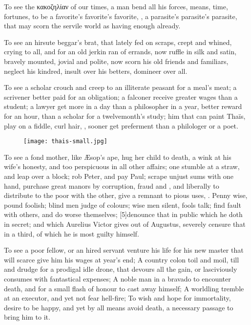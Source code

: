 {To see the \textgreek{κακοζηλίαν} of our times, a man bend all his forces, means,
time, fortunes, to be a favorite's favorite's favorite, \etc{}, a
parasite's parasite's parasite, that may scorn the servile world as
having enough already.

To see an hirsute beggar's brat, that lately fed on scraps, crept and
whined, crying to all, and for an old jerkin ran of errands, now ruffle
in silk and satin, bravely mounted, jovial and polite, now scorn his
old friends and familiars, neglect his kindred, insult over his
betters, domineer over all.

To see a scholar crouch and creep to an illiterate peasant for a meal's
meat; a scrivener better paid for an obligation; a falconer receive
greater wages than a student; a lawyer get more in a day than a
philosopher in a year, better reward for an hour, than a scholar for a
twelvemonth's study; him that can paint Thaïs, play on a fiddle,
curl hair, \etc{}, sooner get preferment than a philologer or a poet.

\begin{figure}[bh]
  \begingroup
  \centering
  \texttt{[image: thais-small.jpg]}
  \label{fig:thais}
\end{figure}

To see a fond mother, like \AE{}sop's ape, hug her child to death, a 
 wink at his wife's honesty, and too perspicuous in all other
affairs; one stumble at a straw, and leap over a block; rob Peter, and
pay Paul; scrape unjust sums with one hand, purchase great manors by
corruption, fraud and , and liberally to distribute to the poor
with the other, give a remnant to pious uses, \etc{}. Penny wise, pound
foolish; blind men judge of colours; wise men silent, fools talk; 
find fault with others, and do worse themselves; [5\baselineskip]denounce that in
public which he doth in secret; and which Aurelius Victor gives out of
Augustus, severely censure that in a third, of which he is most guilty
himself.

To see a poor fellow, or an hired servant venture his life for his new
master that will scarce give him his wages at year's end; A country
colon toil and moil, till and drudge for a prodigal idle drone, that
devours all the gain, or lasciviously consumes with fantastical
expenses; A noble man in a bravado to encounter death, and for a small
flash of honour to cast away himself; A worldling tremble at an
executor, and yet not fear hell-fire; To wish and hope for immortality,
desire to be happy, and yet by all means avoid death, a necessary
passage to bring him to it.

}
